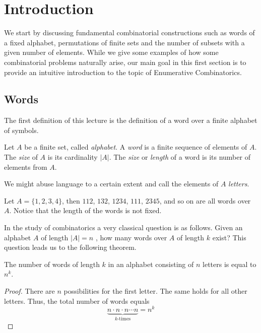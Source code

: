 \section{Introduction}\label{introduction} 

We start by discussing fundamental combinatorial constructions such as words of a fixed alphabet, permutations of finite
sets and the number of subsets with a given number of elements. While we give some examples of how some combinatorial problems 
naturally arise, our main goal in this first section is to provide an intuitive introduction to the topic of 
Enumerative Combinatorics. 

\subsection{Words}

The first definition of this lecture is the definition of a word over a finite alphabet of symbols.

\begin{defn}[word]
Let $A$ be a finite set, called \textit{alphabet}. A \textit{word} is a finite sequence of elements of $A$. The \textit{size} of $A$ is its cardinality $|A|$.
The \textit{size} or \textit{length} of a word is its number of elements from $A$.
\end{defn}
\noindent
We might abuse language to a certain extent and call the elements of $A$ \textit{letters}.

\begin{exmp}
Let $A=\{1, 2, 3, 4\}$, then $112$, $132$, $1234$, $111$, $2345$, and so on are all words over $A$.
Notice that the length of the words is not fixed.    
\end{exmp}

In the study of combinatorics a very classical question is as follows. Given an alphabet $A$ of length $|A|=n$ , how many words over $A$ of length $k$ exist? This question leads us to the following theorem.

\begin{theorem}
The number of words of length $k$ in an alphabet consisting of $n$ letters is equal to $n^k$.
\label{thmNumWords}
\end{theorem}
\begin{proof}
There are $n$ possibilities for the first letter. The same holds for all other letters.
Thus, the total number of words equals
$$
\underbrace{n \cdot n \cdot n \cdots n}_\text{$k$-times} = n^k
$$
\end{proof}

